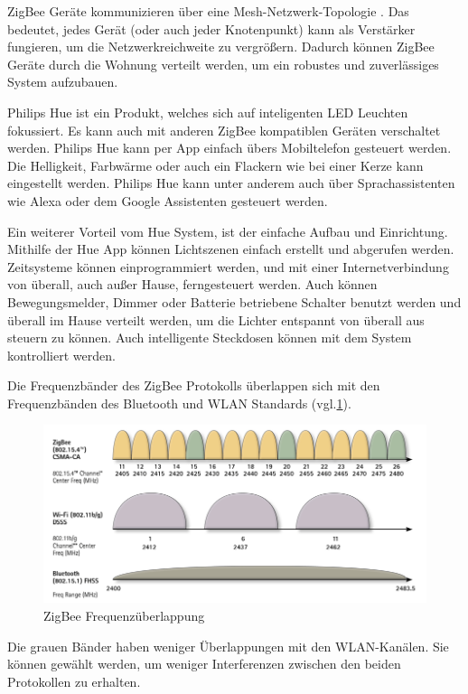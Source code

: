 ZigBee Geräte kommunizieren über eine Mesh-Netzwerk-Topologie \cite[S.10]{GettingStartedWithZigBee}. Das bedeutet, jedes Gerät (oder auch jeder Knotenpunkt) kann als Verstärker fungieren, um die Netzwerkreichweite zu vergrößern. Dadurch können ZigBee Geräte durch die Wohnung verteilt werden, um ein robustes und zuverlässiges System aufzubauen.

Philips Hue ist ein Produkt, welches sich auf inteligenten LED Leuchten fokussiert. Es kann auch mit anderen ZigBee kompatiblen Geräten verschaltet werden. Philips Hue kann per App einfach übers Mobiltelefon gesteuert werden. Die Helligkeit, Farbwärme oder auch ein Flackern wie bei einer Kerze kann eingestellt werden. Philips Hue kann unter anderem auch über Sprachassistenten wie Alexa oder dem Google Assistenten gesteuert werden\cite[S.5]{GettingStartedWithZigBee}.

Ein weiterer Vorteil vom Hue System, ist der einfache Aufbau und Einrichtung. Mithilfe der Hue App können Lichtszenen einfach erstellt und abgerufen werden. Zeitsysteme können einprogrammiert werden, und mit einer Internetverbindung von überall, auch außer Hause, ferngesteuert werden. Auch können Bewegungsmelder, Dimmer oder Batterie betriebene Schalter benutzt werden und überall im Hause verteilt werden, um die Lichter entspannt von überall aus steuern zu können. Auch intelligente Steckdosen können mit dem System kontrolliert werden. 

Die Frequenzbänder des ZigBee Protokolls überlappen sich mit den Frequenzbänden des Bluetooth und WLAN Standards (vgl.\ref{fig:ZigBee_Frequency_bands}).
\begin{figure}[H]
	\centering
	\includegraphics[width=.8\linewidth]{Pictures/ZigBeeRfOverlap}
	\caption{ZigBee Frequenzüberlappung \cite[S.23]{GettingStartedWithZigBee}}
	\label{fig:ZigBee_Frequency_bands}
\end{figure}
Die grauen Bänder haben weniger Überlappungen mit den WLAN-Kanälen. Sie können gewählt werden, um weniger Interferenzen zwischen den beiden Protokollen zu erhalten.

